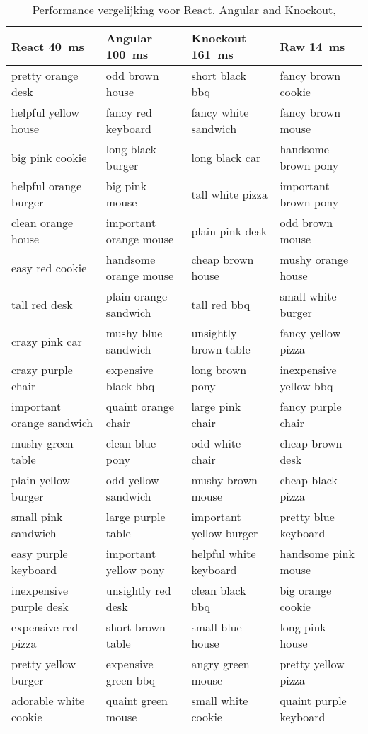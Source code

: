 	\begin{table}
		\scriptsize
		\centering
		\begin{tabular}{@{}llll@{}}
			\toprule
				React \hfill \SI{40}{\milli\second} & Angular \hfill \SI{100}{\milli\second} & Knockout \hfill \SI{161}{\milli\second} & Raw \hfill \SI{14}{\milli\second} \\ \midrule
				pretty orange desk & odd brown house & short black bbq & fancy brown cookie \\
				helpful yellow house & fancy red keyboard & fancy white sandwich & fancy brown mouse \\
				big pink cookie & long black burger & long black car & handsome brown pony \\
				helpful orange burger & big pink mouse & tall white pizza & important brown pony \\
				clean orange house & important orange mouse & plain pink desk & odd brown mouse \\
				easy red cookie & handsome orange mouse & cheap brown house & mushy orange house \\
				tall red desk & plain orange sandwich & tall red bbq & small white burger \\
				crazy pink car & mushy blue sandwich & unsightly brown table & fancy yellow pizza \\
				crazy purple chair & expensive black bbq & long brown pony & inexpensive yellow bbq \\
				important orange sandwich & quaint orange chair & large pink chair & fancy purple chair \\
				mushy green table & clean blue pony & odd white chair & cheap brown desk \\
				plain yellow burger & odd yellow sandwich & mushy brown mouse & cheap black pizza \\
				small pink sandwich & large purple table & important yellow burger & pretty blue keyboard \\
				easy purple keyboard & important yellow pony & helpful white keyboard & handsome pink mouse \\
				inexpensive purple desk & unsightly red desk & clean black bbq & big orange cookie \\
				expensive red pizza & short brown table & small blue house & long pink house \\
				pretty yellow burger & expensive green bbq & angry green mouse & pretty yellow pizza \\
				adorable white cookie & quaint green mouse & small white cookie & quaint purple keyboard \\
			\bottomrule
		\end{tabular}
	\caption{Performance vergelijking voor React, Angular and Knockout, \citep{Harrington:React}}
	\label{tbl:perfcompharrington}
	\end{table}
	
